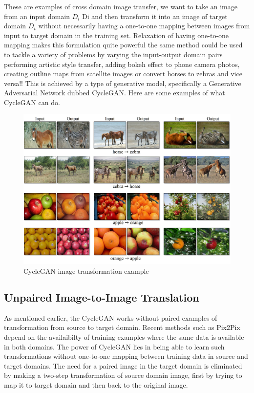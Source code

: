 \documentclass[peerreview]{IEEEtran}
\begin{document}
These are examples of cross domain image transfer, we want to take an image from an input domain $D_i$ Di and then transform it into an image of target domain $D_t$ without necessarily having a one-to-one mapping between images from input to target domain in the training set. Relaxation of having one-to-one mapping makes this formulation quite powerful the same method could be used to tackle a variety of problems by varying the input-output domain pairs performing artistic style transfer, adding bokeh effect to phone camera photos, creating outline maps from satellite images or convert horses to zebras and vice versa!! This is achieved by a type of generative model, specifically a Generative Adversarial Network dubbed CycleGAN. Here are some examples of what CycleGAN can do.

\begin{figure}[H]
    \centering
    \includegraphics[width=0.8\columnwidth]{gan_example.jpg}
    \caption{CycleGAN image transformation example}
    \label{fig:s=cyclegan_example}
\end{figure}

\subsection{Unpaired Image-to-Image Translation}
As mentioned earlier, the CycleGAN works without paired examples of transformation from source to target domain. Recent methods such as Pix2Pix depend on the availaibilty of training examples where the same data is available in both domains. The power of CycleGAN lies in being able to learn such transformations without one-to-one mapping between training data in source and target domains. The need for a paired image in the target domain is eliminated by making a two-step transformation of source domain image, first by trying to map it to target domain and then back to the original image.
\end{document}

